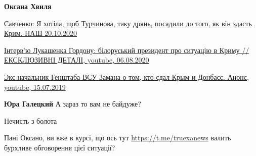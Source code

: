 \begin{itemize}
\begin{itemize}
 
\textbf{Оксана Хвиля} 

\href{https://youtu.be/QtkPLwvyBjA}{%
Савченко: Я хотіла, щоб Турчинова, таку дрянь, посадили до того, як він здасть Крим. НАШ 20.10.2020%
}

\href{https://www.youtube.com/watch?v=V9nAHNJVSck}{%
Інтерв'ю Лукашенка Гордону: білоруський президент про ситуацію в Криму // ЕКСКЛЮЗИВНІ ДЕТАЛІ, youtube, 06.08.2020%
}

\href{https://www.youtube.com/watch?v=f0l3cd2oGSM}{%
Экс-начальник Генштаба ВСУ Замана о том, кто сдал Крым и Донбасс. Анонс, youtube, 15.07.2019%
}

 
\textbf{Юра Галецкий} А зараз то вам не байдуже?

\end{itemize}

 
Нечисть з болота

 
Пані Оксано, ви вже в курсі, що ось тут \url{https://t.me/truexanews} валить
бурхливе обговорення цієї ситуації?

\begin{itemize}
 

\end{itemize}
\end{itemize}

